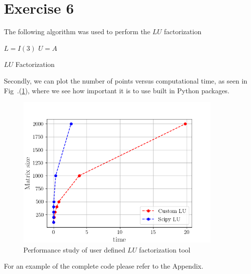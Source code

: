 \section{Exercise 6}
The following algorithm was used to perform the $LU$ factorization 

\begin{algorithm}[H]
\DontPrintSemicolon
\SetAlgoLined
{}
\BlankLine
$L = I(3)$    \;
$U = A $    \;
\BlankLine
\caption{$LU$ Factorization}
\end{algorithm}

Secondly, we can plot the number of points versus computational time, as
seen in Fig~.(\ref{fig:lu-factorization}), where we see how important it
is to use built in Python packages. 
\begin{figure}[H]
    \includegraphics[height=3.0in]{media/exercise-6.png}
    \caption{Performance study of user defined $LU$ factorization tool}
    \label{fig:lu-factorization}
\end{figure}
For an example of the complete code please refer to the Appendix.
